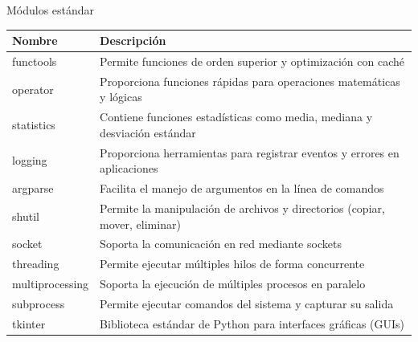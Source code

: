 \documentclass[11pt]{beamer}
\begin{document}
\begin{frame}{Módulos estándar}
	\scriptsize
	\begin{tabularx}{\linewidth}{>{\raggedright\arraybackslash}p{3.5cm} X}
		\toprule
		\textbf{Nombre} & \textbf{Descripción} \\
		\midrule
		functools & Permite funciones de orden superior y optimización con caché \\
		operator & Proporciona funciones rápidas para operaciones matemáticas y lógicas \\
		statistics & Contiene funciones estadísticas como media, mediana y desviación estándar \\
		logging & Proporciona herramientas para registrar eventos y errores en aplicaciones \\
		argparse & Facilita el manejo de argumentos en la línea de comandos \\
		shutil & Permite la manipulación de archivos y directorios (copiar, mover, eliminar) \\
		socket & Soporta la comunicación en red mediante sockets \\
		threading & Permite ejecutar múltiples hilos de forma concurrente \\
		multiprocessing & Soporta la ejecución de múltiples procesos en paralelo \\
		subprocess & Permite ejecutar comandos del sistema y capturar su salida \\
		tkinter & Biblioteca estándar de Python para interfaces gráficas (GUIs) \\
		\bottomrule
	\end{tabularx}
\end{frame}
\end{document}
